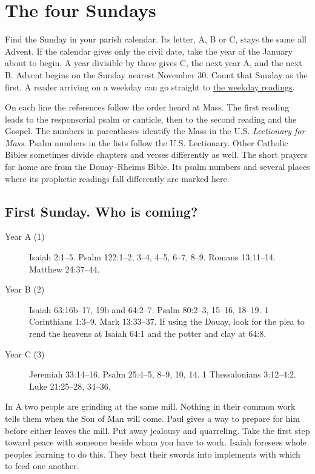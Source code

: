 \section{The four Sundays}
\label{sec:pc-advent-sundays}

Find the Sunday in your parish calendar. Its letter, A, B or C, stays the
same all Advent. If the calendar gives only the civil date, take the year
of the January about to begin. A year divisible by three gives C, the
next year A, and the next B. Advent begins on the Sunday nearest November
30. Count that Sunday as the first. A reader arriving on a weekday can go
straight to \hyperref[sec:pc-advent-weekdays]{the weekday readings}.

On each line the references follow the order heard at Mass. The first
reading leads to the responsorial psalm or canticle, then to the second
reading and the Gospel. The numbers in parentheses identify the Mass in
the U.S. \emph{Lectionary for Mass}. Psalm numbers in the lists follow
the U.S. Lectionary. Other Catholic Bibles sometimes divide chapters
and verses differently as well. The short prayers for home are from the
Douay--Rheims Bible. Its psalm numbers and several places where its
prophetic readings fall differently are marked here.

\subsection{First Sunday. Who is coming?}

\begin{description}
\item[Year A (1)] Isaiah 2:1--5. Psalm 122:1--2, 3--4, 4--5, 6--7, 8--9.
Romans 13:11--14. Matthew 24:37--44.
\item[Year B (2)] Isaiah 63:16b--17, 19b and 64:2--7.
Psalm 80:2--3, 15--16, 18--19. 1 Corinthians 1:3--9. Mark 13:33--37.
If using the Douay, look for the plea to rend the heavens at Isaiah
64:1 and the potter and clay at 64:8.
\item[Year C (3)] Jeremiah 33:14--16. Psalm 25:4--5, 8--9, 10, 14.
1 Thessalonians 3:12--4:2. Luke 21:25--28, 34--36.
\end{description}

In A two people are grinding at the same mill. Nothing in their common
work tells them when the Son of Man will come. Paul gives a way to
prepare for him before either leaves the mill. Put away jealousy and
quarreling. Take the first step toward peace with someone beside whom
you have to work. Isaiah foresees whole peoples learning to do this.
They beat their swords into implements with which to feed one another.

